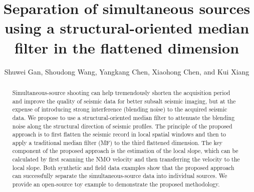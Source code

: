 

\title{Separation of simultaneous sources using a structural-oriented median filter in the flattened dimension}
\author{Shuwei Gan\footnotemark[1] , Shoudong Wang\footnotemark[1], Yangkang Chen\footnotemark[2], Xiaohong Chen\footnotemark[1], and Kui Xiang\footnotemark[1]}

\address{
\footnotemark[1]State Key Laboratory of Petroleum Resources and Prospecting \\
China University of Petroleum \\
Fuxue Road 18th\\
Beijing, China, 102200 \\
gsw19900128@126.com \& wangshoudong@163.com \& chenxh@cup.edu.cn \& xiangkui15@126.com \\
\footnotemark[2]Bureau of Economic Geology, \\
Jackson School of Geosciences \\
The University of Texas at Austin \\
University Station, Box X \\
Austin, TX 78713-8924 \\
USA \\
}


\maketitle

\begin{abstract}
Simultaneous-source shooting can help tremendously shorten the acquisition period and improve the quality of seismic data for better subsalt seismic imaging, but at the expense of introducing strong interference (blending noise) to the acquired seismic data. We propose to use a structural-oriented median filter to attenuate the blending noise along the structural direction of seismic profiles. The principle of the proposed approach is to first flatten the seismic record in local spatial windows and then to apply a traditional median filter (MF) to the third flattened dimension. The key component of the proposed approach is the estimation of the local slope, which can be calculated by first scanning the NMO velocity and then transferring the velocity to the local slope. Both synthetic and field data examples show that the proposed approach can successfully separate the simultaneous-source data into individual sources. We provide an open-source toy example to  demonstrate  the proposed methodology. 
\end{abstract}

